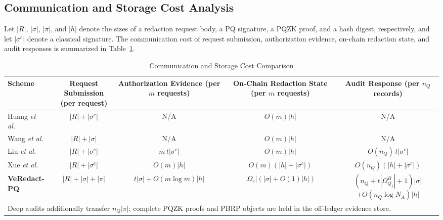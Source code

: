\documentclass[lettersize,journal]{IEEEtran}
\begin{document}
\subsection{Communication and Storage Cost Analysis}
\label{subsec:communication-cost}

Let $|R|$, $|\sigma|$, $|\pi|$, and $|h|$ denote the sizes of a
redaction request body, a PQ signature, a PQZK proof, and a hash digest,
respectively, and let $|\sigma^{c}|$ denote a classical signature. The
communication cost of request submission, authorization evidence,
on-chain redaction state, and audit responses is summarized in
Table~\ref{tab:comm-cost}.

\begin{table}[t]
\centering
\caption{Communication and Storage Cost Comparison}
\label{tab:comm-cost}
\footnotesize
\renewcommand{\arraystretch}{1.25}
\setlength{\tabcolsep}{4pt}
\begin{tabular}{lcccc}
\toprule
\textbf{Scheme} &
\makecell{\textbf{Request Submission}\\\textbf{(per request)}} &
\makecell{\textbf{Authorization Evidence}\\\textbf{(per $m$ requests)}} &
\makecell{\textbf{On-Chain Redaction State}\\\textbf{(per $m$ requests)}} &
\makecell{\textbf{Audit Response}\\\textbf{(per $n_Q$ records)}} \\
\midrule
Huang \emph{et al.}~\cite{ref14}  %
& $|R|+|\sigma^{c}|$ & N/A & $O(m)|h|$ & N/A \\
Wang \emph{et al.}~\cite{ref17}   %
& $|R|+|\sigma|$ & N/A & $O(m)|h|$ & N/A \\
Liu \emph{et al.}~\cite{ref27}    %
& $|R|+|\sigma^{c}|$ & $m\,t|\sigma^{c}|$ & $O(m)|h|$ & $O(n_Q)\,t|\sigma^{c}|$ \\
Xue \emph{et al.}~\cite{ref33}    %
& $|R|+|\sigma^{c}|$ & $O(m)|h|$ & $O(m)(|h|+|\sigma^{c}|)$ & $O(n_Q)(|h|+|\sigma^{c}|)$ \\
\midrule
\textbf{VeRedact-PQ}
& $|R|+|\sigma|+|\pi|$
& $t|\sigma|+O(m\log m)|h|$
& $|\Omega_e|(|\sigma|+O(1)|h|)$
& \makecell{$(n_Q+t|\Omega_{Q_j}^B|+1)|\sigma|$\\$+O(n_Q\log N_A)|h|$} \\
\bottomrule
\multicolumn{5}{l}{\footnotesize Deep audits additionally transfer $n_Q|\pi|$; complete PQZK proofs and PBRP objects are held in the off-ledger evidence store.}
\end{tabular}
\end{table}
\end{document}
